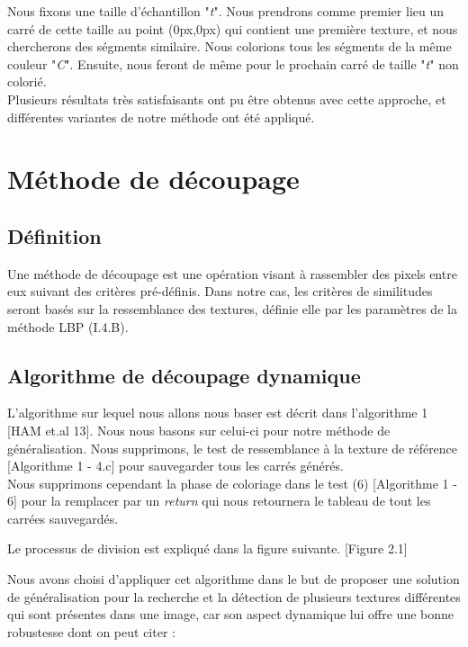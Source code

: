 Nous fixons une taille d'échantillon "\textit{t}". Nous prendrons comme premier lieu un carré de cette taille au point (0px,0px) qui contient une première texture, et nous chercherons des ségments similaire. Nous colorions tous les ségments de la même couleur "\textit{C}". Ensuite, nous feront de même pour le prochain carré de taille "\textit{t}" non colorié.\\

Plusieurs résultats très satisfaisants ont pu être obtenus avec cette approche, et différentes variantes de notre méthode ont été appliqué.


\section{Méthode de découpage}

\subsection{Définition}
\indent Une méthode de découpage est une opération visant à rassembler des pixels entre eux suivant des critères pré-définis. Dans notre cas, les critères de similitudes seront basés sur la ressemblance des textures, définie elle par les paramètres de la méthode LBP (I.4.B).\\

\subsection{Algorithme de découpage dynamique}
\indent L'algorithme sur lequel nous allons nous baser est décrit dans l'algorithme 1 [HAM et.al 13].
Nous nous basons sur celui-ci pour notre méthode de généralisation. Nous supprimons, le test de ressemblance à la texture de référence [Algorithme 1 - 4.c] pour sauvegarder tous les carrés générés.\\
\indent Nous supprimons cependant la phase de coloriage dans le test (6) [Algorithme 1 - 6] pour la remplacer par un \textit{return} qui nous retournera le tableau de tout les carrées sauvegardés.

Le processus de division est expliqué dans la figure suivante. [Figure 2.1]

\indent Nous avons choisi d'appliquer cet algorithme dans le but de proposer une solution de généralisation pour la recherche et la détection de plusieurs textures différentes qui sont présentes dans une image, car son aspect dynamique lui offre une bonne robustesse dont on peut citer :\\

